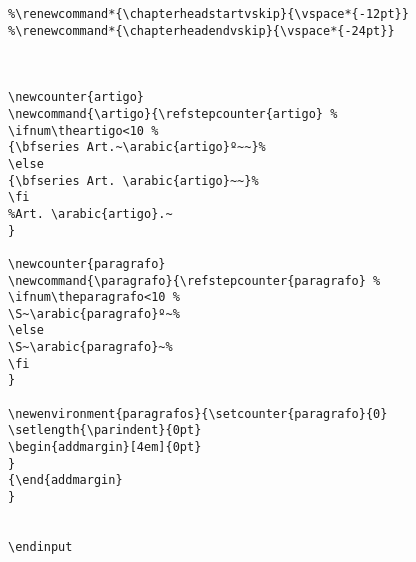 \documentclass{ltxdoc}
\begin{document}
\begin{lstlisting}
%\renewcommand*{\chapterheadstartvskip}{\vspace*{-12pt}}
%\renewcommand*{\chapterheadendvskip}{\vspace*{-24pt}}



\newcounter{artigo}
\newcommand{\artigo}{\refstepcounter{artigo} % 
\ifnum\theartigo<10 %
{\bfseries Art.~\arabic{artigo}º~~}%
\else
{\bfseries Art. \arabic{artigo}~~}%
\fi
%Art. \arabic{artigo}.~
}

\newcounter{paragrafo}
\newcommand{\paragrafo}{\refstepcounter{paragrafo} % 
\ifnum\theparagrafo<10 %
\S~\arabic{paragrafo}º~%
\else
\S~\arabic{paragrafo}~%
\fi
}

\newenvironment{paragrafos}{\setcounter{paragrafo}{0}
\setlength{\parindent}{0pt}
\begin{addmargin}[4em]{0pt} 
}
{\end{addmargin}
}


\endinput

\end{lstlisting}
\end{document}
